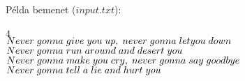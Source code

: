 \documentclass[12pt]{article}
\begin{document}
Példa bemenet ($input.txt$):\\\\
$4$\\
$Never \hspace{1mm} gonna \hspace{1mm} give \hspace{1mm} you \hspace{1mm} up,\hspace{1mm} never \hspace{1mm} gonna \hspace{1mm} let you \hspace{1mm} down$\\
$Never \hspace{1mm} gonna \hspace{1mm} run \hspace{1mm} around \hspace{1mm} and \hspace{1mm} desert \hspace{1mm} you$\\
$Never \hspace{1mm} gonna \hspace{1mm} make \hspace{1mm} you \hspace{1mm} cry, \hspace{1mm} never \hspace{1mm} gonna \hspace{1mm} say \hspace{1mm} goodbye$\\
$Never \hspace{1mm} gonna \hspace{1mm} tell \hspace{1mm} a \hspace{1mm} lie \hspace{1mm} and \hspace{1mm} hurt \hspace{1mm} you$\\
\end{document}
